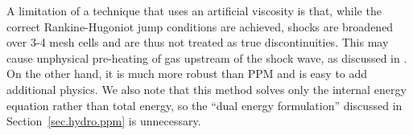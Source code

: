 A limitation of a technique that uses an artificial viscosity is that, while the correct Rankine-Hugoniot jump conditions are achieved, shocks are broadened over 3-4 mesh cells and are thus not treated as true discontinuities. This may cause unphysical pre-heating of gas upstream of the shock wave, as discussed in \citet{1994ApJ...429..434A}.  On the other hand, it is much more robust than PPM and is easy to add additional physics.  We also note that this method solves only the internal energy equation rather than total energy, so the ``dual energy formulation'' discussed in Section~\ref{sec.hydro.ppm} is unnecessary.
